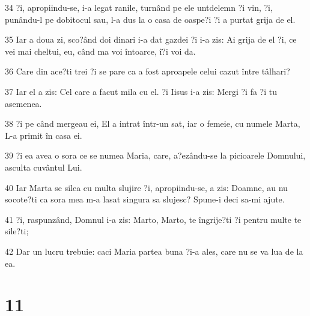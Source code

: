 \par 34 ?i, apropiindu-se, i-a legat ranile, turnând pe ele untdelemn ?i vin, ?i, punându-l pe dobitocul sau, l-a dus la o casa de oaspe?i ?i a purtat grija de el.
\par 35 Iar a doua zi, sco?ând doi dinari i-a dat gazdei ?i i-a zis: Ai grija de el ?i, ce vei mai cheltui, eu, când ma voi întoarce, î?i voi da.
\par 36 Care din ace?ti trei ?i se pare ca a fost aproapele celui cazut între tâlhari?
\par 37 Iar el a zis: Cel care a facut mila cu el. ?i Iisus i-a zis: Mergi ?i fa ?i tu asemenea.
\par 38 ?i pe când mergeau ei, El a intrat într-un sat, iar o femeie, cu numele Marta, L-a primit în casa ei.
\par 39 ?i ea avea o sora ce se numea Maria, care, a?ezându-se la picioarele Domnului, asculta cuvântul Lui.
\par 40 Iar Marta se silea cu multa slujire ?i, apropiindu-se, a zis: Doamne, au nu socote?ti ca sora mea m-a lasat singura sa slujesc? Spune-i deci sa-mi ajute.
\par 41 ?i, raspunzând, Domnul i-a zis: Marto, Marto, te îngrije?ti ?i pentru multe te sile?ti;
\par 42 Dar un lucru trebuie: caci Maria partea buna ?i-a ales, care nu se va lua de la ea.

\chapter{11}

